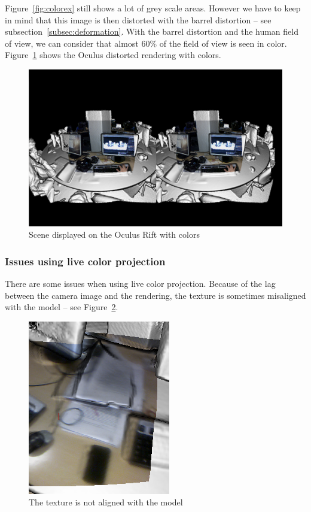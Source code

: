 \documentclass[12pt, twoside]{article}
\begin{document}
Figure~\ref{fig:colorex} still shows a lot of grey scale areas. However we have to keep in mind that this image is then distorted with the barrel distortion -- see subsection~\ref{subsec:deformation}. With the barrel distortion and the human field of view, we can consider that almost 60\% of the field of view is seen in color. Figure~\ref{fig:oculuscolor} shows the Oculus distorted rendering with colors.

\begin{figure}[!h]
  \centering
  \includegraphics[scale=0.3]{ColorRift.png}
  \caption{\label{fig:oculuscolor} Scene displayed on the Oculus Rift with colors}
\end{figure}

\subsubsection{Issues using live color projection}
There are some issues when using live color projection. Because of the lag between the camera image and the rendering, the texture is sometimes misaligned with the model -- see Figure~\ref{fig:texture}.

\begin{figure}[!h]
  \centering
  \includegraphics[scale=0.5]{TextureIssue.png}
  \caption{\label{fig:texture} The texture is not aligned with the model}
\end{figure}
\end{document}
